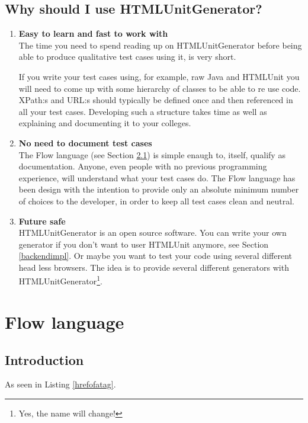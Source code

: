 \documentclass[a4paper,11pt]{kth-mag}
\begin{document}
\section{Why should I use HTMLUnitGenerator?}
\begin{enumerate}
\item \textbf{Easy to learn and fast to work with}\\
The time you need to spend reading up on HTMLUnitGenerator before being able to produce qualitative test cases using it, is very short.

If you write your test cases using, for example, raw Java and HTMLUnit you will need to come up with some hierarchy of classes to be able to re use code. XPath:s and URL:s should typically be defined once and then referenced in all your test cases. Developing such a structure takes time as well as explaining and documenting it to your colleges.

\item \textbf{No need to document test cases}\\
The Flow language (see Section \ref{flowlanguage}) is simple enaugh to, itself, qualify as documentation. Anyone, even people with no previous programming experience, will understand what your test cases do. The Flow language has been design with the intention to provide only an absolute minimum number of choices to the developer, in order to keep all test cases clean and neutral.

\item \textbf{Future safe}\\
HTMLUnitGenerator is an open source software. You can write your own generator if you don't want to user HTMLUnit anymore, see Section \ref{backendimpl}. Or maybe you want to test your code using several different head less browsers. The idea is to provide several different generators with HTMLUnitGenerator\footnote{Yes, the name will change!}.
\end{enumerate}

\chapter{Flow language}
\label{frontend}

\section{Introduction}
\label{flowlanguage}
\lstset{basicstyle=\footnotesize, caption=Find href of an a tag, label=hrefofatag, numbers=left, frame=single, captionpos=b}

As seen in Listing \ref{hrefofatag}.
\end{document}
